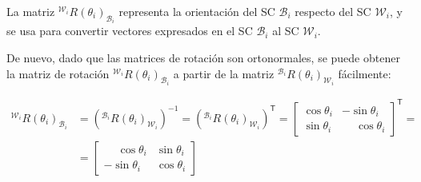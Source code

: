 \documentclass[11pt,a4paper]{article}
\newcommand{\trans}{\mathsf{T}}      %
\newcommand{\frameBi}{\mathcal{B}_i}
\newcommand{\frameWi}{\mathcal{W}_i}
\begin{document}
La matriz \({}^{\frameWi} R(\theta_i)_{\frameBi}\) representa la orientación del SC \(\frameBi\) respecto del SC \(\frameWi\), y se usa para convertir vectores expresados en el SC \(\frameBi\) al SC \(\frameWi\).

De nuevo, dado que las matrices de rotación son ortonormales, se puede obtener la matriz de rotación \({}^{\frameWi} R(\theta_i)_{\frameBi}\) a partir de la matriz \({}^{\frameBi} R(\theta_i)_{\frameWi}\) fácilmente:

\begin{equation}
    \begin{aligned}
        {}^{\frameWi} R(\theta_i)_{\frameBi} & = \left({}^{\frameBi} R(\theta_i)_{\frameWi}\right)^{-1} = \left({}^{\frameBi} R(\theta_i)_{\frameWi}\right)^{\trans} = \begin{bmatrix}
                                                                                                                                                                           \cos\theta_i & -\sin\theta_i           \\
                                                                                                                                                                           \sin\theta_i & \phantom{-}\cos\theta_i
                                                                                                                                                                       \end{bmatrix}^{\trans} = \\
                                             & = \begin{bmatrix}
                                                     \phantom{-}\cos\theta_i & \sin\theta_i \\
                                                     -\sin\theta_i           & \cos\theta_i
                                                 \end{bmatrix}
    \end{aligned}
\end{equation}
\end{document}
